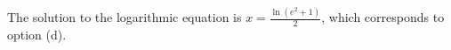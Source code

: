 \documentclass[preview]{standalone}
\begin{document}
\begin{center}
The solution to the logarithmic equation is $x = \frac{\ln(e^2 + 1)}{2}$, which corresponds to option (d).
\end{center}
\end{document}
